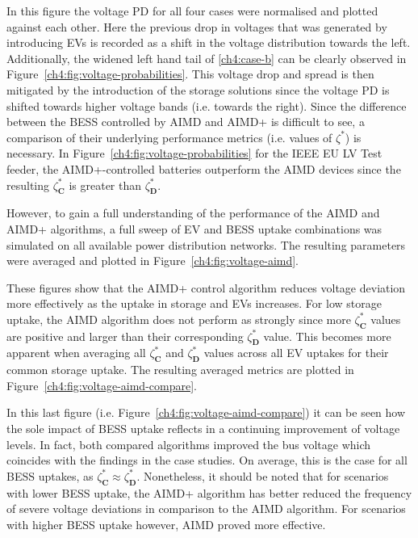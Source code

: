 In this figure the voltage PD for all four cases were normalised and plotted against each other.
Here the previous drop in voltages that was generated by introducing EVs is recorded as a shift in the voltage distribution towards the left.
Additionally, the widened left hand tail of \ref{ch4:case-b} can be clearly observed in Figure~\ref{ch4:fig:voltage-probabilities}.
This voltage drop and spread is then mitigated by the introduction of the storage solutions since the voltage PD is shifted towards higher voltage bands (i.e. towards the right).
Since the difference between the BESS controlled by AIMD and AIMD+ is difficult to see, a comparison of their underlying performance metrics (i.e. values of $\zeta^{*}$) is necessary.
In Figure~\ref{ch4:fig:voltage-probabilities} for the IEEE EU LV Test feeder, the AIMD+-controlled batteries outperform the AIMD devices since the resulting $\zeta_\textbf{C}^{*}$ is greater than $\zeta_\textbf{D}^{*}$.



However, to gain a full understanding of the performance of the AIMD and AIMD+ algorithms, a full sweep of EV and BESS uptake combinations was simulated on all available power distribution networks.
The resulting parameters were averaged and plotted in Figure~\ref{ch4:fig:voltage-aimd}.

These figures show that the AIMD+ control algorithm reduces voltage deviation more effectively as the uptake in storage and EVs increases.
For low storage uptake, the AIMD algorithm does not perform as strongly since more $\zeta_\textbf{C}^{*}$ values are positive and larger than their corresponding $\zeta_\textbf{D}^{*}$ value.
This becomes more apparent when averaging all $\zeta_\textbf{C}^{*}$ and $\zeta_\textbf{D}^{*}$ values across all EV uptakes for their common storage uptake.
The resulting averaged metrics are plotted in Figure~\ref{ch4:fig:voltage-aimd-compare}.



In this last figure (i.e. Figure~\ref{ch4:fig:voltage-aimd-compare}) it can be seen how the sole impact of BESS uptake reflects in a continuing improvement of voltage levels.
In fact, both compared algorithms improved the bus voltage which coincides with the findings in the case studies.
On average, this is the case for all BESS uptakes, as $\zeta_\textbf{C}^{*} \approx \zeta_\textbf{D}^{*}$.
Nonetheless, it should be noted that for scenarios with lower BESS uptake, the AIMD+ algorithm has better reduced the frequency of severe voltage deviations in comparison to the AIMD algorithm.
For scenarios with higher BESS uptake however, AIMD proved more effective.

